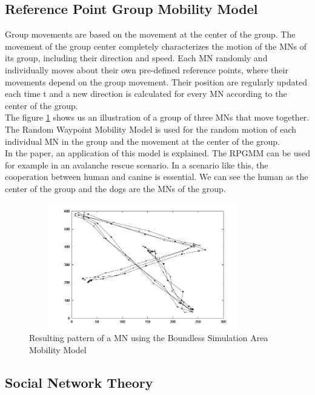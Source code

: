 \newpage

\subsection{Reference Point Group Mobility Model}

Group movements are based on the movement at the center of the group. The movement of the group center completely characterizes the motion of the MNs of its group, including their direction and speed. Each MN randomly and individually moves about their own pre-defined reference points, where their movements depend on the group movement. Their position are regularly updated each time t and a new direction is calculated for every MN according to the center of the group.\\
The figure \ref{RPGMMFig} shows us an illustration of a group of three MNs that move together. The Random Waypoint Mobility Model is used for the random motion of each individual MN in the group and the movement at the center of the group.\\
In the paper, an application of this model is explained. The RPGMM can be used for example in an avalanche rescue scenario. In a scenario like this, the cooperation between human and canine is essential. We can see the human as the center of the group and the dogs are the MNs of the group.\\

\begin{figure}[h]
\center
\includegraphics[width=10cm,height=55mm]{../images/rpgmmodel1.png}
\caption{\label{RPGMMFig}Resulting pattern of a MN using the Boundless Simulation Area Mobility Model}
\end{figure}

\newpage

\subsection{Social Network Theory}

